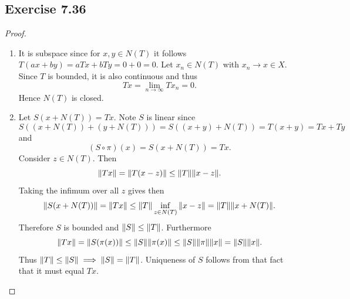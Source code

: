 \documentclass[hw_all.tex]{subfiles}
\begin{document}
\subsection{Exercise 7.36}
\begin{proof}
    \begin{enumerate}
        \item 
            It is subspace since for $x,y\in N(T)$ it follows $T(ax + by) = aTx + bTy = 0 + 0 = 0$. Let $x_n \in N(T)$ with $x_n \to x \in X$. Since $T$ is bounded, it is also continuous and thus
            \[
                Tx = \lim_{n \to \infty} Tx_n = 0
            .\]
            Hence $N(T)$ is closed.

        \item 
            Let $S(x + N(T)) = Tx$. Note $S$ is linear since
            \[
                S((x + N(T)) + (y + N(T))) = S((x + y) + N(T)) = T(x + y) = Tx + Ty
            \]
            and
            \[
                (S \circ \pi)(x) = S(x + N(T)) = Tx
            .\]
            Consider $z \in N(T)$. Then
            \[
                \norm{Tx} = \norm{T(x - z)} \leq \norm{T} \norm{x - z}
            .\]
            Taking the infimum over all $z$ gives then
            \[
                \norm{S(x + N(T))} = \norm{Tx} \leq \norm{T} \inf_{z \in N(T)} \norm{x - z} = \norm{T} \norm{x + N(T)}
            .\]
            Therefore $S$ is bounded and $\norm{S} \leq \norm{T}$. Furthermore
            \[
                \norm{Tx} = \norm{S(\pi(x))} \leq \norm{S} \norm{\pi(x)} \leq \norm{S} \norm{\pi} \norm{x} = \norm{S} \norm{x}
            .\]
            Thus $\norm{T} \leq \norm{S} \implies \norm{S} = \norm{T}$. Uniqueness of $S$ follows from that fact that it must equal $Tx$.
    \end{enumerate}
\end{proof}
\end{document}
